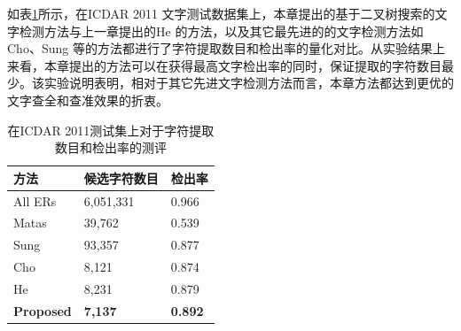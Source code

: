         如表\ref{tab.c4_icdar11}所示，在ICDAR 2011 文字测试数据集上，本章提出的基于二叉树搜索的文字检测方法与上一章提出的He\cite{He2017scene} 的方法，以及其它最先进的的文字检测方法如Cho\cite{Cho2016Canny}、Sung\cite{Sung2015Scene} 等的方法都进行了字符提取数目和检出率的量化对比。从实验结果上来看，本章提出的方法可以在获得最高文字检出率的同时，保证提取的字符数目最少。该实验说明表明，相对于其它先进文字检测方法而言，本章方法都达到更优的文字查全和查准效果的折衷。

        \begin{table}[!h]
        \centering
        \caption{在ICDAR 2011测试集上对于字符提取数目和检出率的测评}
        \begin{tabular}{p{} p{} p{}}
        \toprule
        方法 & 候选字符数目 & 检出率 \\
        \midrule
        All ERs & 6,051,331 & 0.966 \\
        Matas\cite{Matas2004Robust} & 39,762 & 0.539 \\
        Sung\cite{Sung2015Scene} & 93,357 & 0.877  \\
        Cho\cite{Cho2016Canny} & 8,121 & 0.874 \\
        He\cite{He2017scene} & 8,231 & 0.879 \\
        \textbf{Proposed} & \textbf{7,137} & \textbf{0.892} \\
        \bottomrule
        \end{tabular}
        \label{tab.c4_icdar11}
        \end{table}



